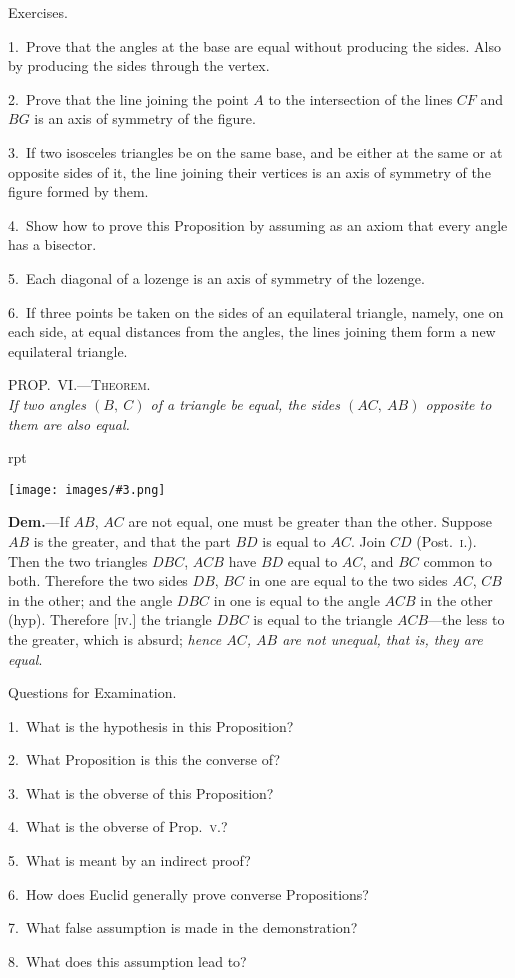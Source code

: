 \documentclass[oneside]{book}
\newcounter{wrapwidth}
\newcommand\myprop[2]{
\bigskip\Needspace*{4\baselineskip}\begin{center}\textsc{#1}\\\medskip\emph{#2}\par\end{center}
}
\newcommand\exhead[1]{
\Needspace*{5\baselineskip}\begin{center}
\textsf{#1}
\end{center}
}
\newcommand\imgflow[3]{
\setcounter{wrapwidth}{#1}
\begin{wrapfigure}[#2]{r}{\value{wrapwidth}pt}
\begin{center}
\vspace{-0.3in}
\texttt{[image: images/\#3.png]}
\end{center}
\end{wrapfigure}
}
\begin{document}
\exhead{Exercises.}

\begin{footnotesize}
1.~Prove that the angles at the base are equal without producing
the sides. Also by producing the sides through the vertex.

2.~Prove that the line joining the point $A$ to the intersection of
the lines $CF$ and $BG$ is an axis of symmetry of the figure.

3.~If two isosceles triangles be on the same base, and be either
at the same or at opposite sides of it, the line joining their vertices
is an axis of symmetry of the figure formed by them.

4.~Show how to prove this Proposition by assuming as an
axiom that every angle has a bisector.

5.~Each diagonal of a lozenge is an axis of symmetry of the
lozenge.

6.~If three points be taken on the sides of an equilateral triangle,
namely, one on each side, at equal distances from the
angles, the lines joining them form a new equilateral triangle.
\par\end{footnotesize}


\myprop{PROP\@.~VI\@.---Theorem.}{If two angles $(B,\ C)$ of a triangle be equal, the sides
$(AC,\ AB)$ opposite to them are also equal.}

\imgflow{79}{8}{f019}

\textbf{Dem.}---If $AB$, $AC$ are not equal, one must be greater
than the other. Suppose $AB$ is the
greater, and that the part $BD$ is equal
to $AC$. Join $CD$ (Post.~\textsc{i.}). Then the
two triangles $DBC$, $ACB$ have $BD$ equal
to $AC$, and $BC$ common to both. Therefore
the two sides $DB$, $BC$ in one are
equal to the two sides $AC$, $CB$ in the
other; and the angle $DBC$ in one is
equal to the angle $ACB$ in the other (hyp). Therefore
[\textsc{iv.}] the triangle $DBC$ is equal to the triangle
$ACB$---the less to the greater, which is absurd; \emph{hence
$AC$, $AB$ are not unequal, that is, they are equal}.


\exhead{Questions for Examination.}

\begin{footnotesize}
1.~What is the hypothesis in this Proposition?

2.~What Proposition is this the converse of?

3.~What is the obverse of this Proposition?

4.~What is the obverse of Prop.~\textsc{v.}?

5.~What is meant by an indirect proof?

6.~How does Euclid generally prove converse Propositions?

7.~What false assumption is made in the demonstration?

8.~What does this assumption lead to?
\par\end{footnotesize}
\end{document}
